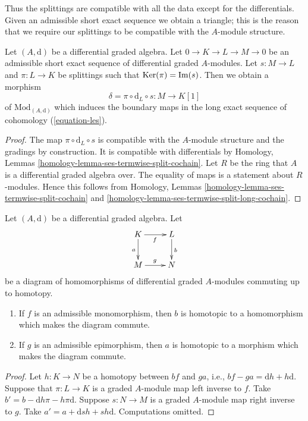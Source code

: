 \noindent
Thus the splittings are compatible with all the data except for
the differentials. Given an admissible short exact sequence we
obtain a triangle; this is the reason that we require our splittings
to be compatible with the $A$-module structure.

\begin{lemma}
\label{lemma-admissible-ses}
Let $(A, \text{d})$ be a differential graded algebra.
Let $0 \to K \to L \to M \to 0$ be an admissible short exact sequence
of differential graded $A$-modules. Let $s : M \to L$ and $\pi : L \to K$
be splittings such that $\mathop{\mathrm{Ker}}(\pi) = \mathop{\mathrm{Im}}(s)$.
Then we obtain a morphism
$$
\delta = \pi \circ \text{d}_L \circ s : M \to K[1]
$$
of $\text{Mod}_{(A, \text{d})}$ which induces the boundary maps
in the long exact sequence of cohomology (\ref{equation-les}).
\end{lemma}

\begin{proof}
The map $\pi \circ \text{d}_L \circ s$ is compatible with the $A$-module
structure and the gradings by construction. It is compatible with
differentials by Homology, Lemmas
\ref{homology-lemma-ses-termwise-split-cochain}.
Let $R$ be the ring that $A$ is a differential graded algebra over.
The equality of maps is a statement about $R$-modules. Hence this
follows from Homology, Lemmas
\ref{homology-lemma-ses-termwise-split-cochain} and
\ref{homology-lemma-ses-termwise-split-long-cochain}.
\end{proof}

\begin{lemma}
\label{lemma-make-commute-map}
Let $(A, \text{d})$ be a differential graded algebra. Let
$$
\xymatrix{
K \ar[r]_f \ar[d]_a & L \ar[d]^b \\
M \ar[r]^g & N
}
$$
be a diagram of homomorphisms of differential graded $A$-modules
commuting up to homotopy.
\begin{enumerate}
\item If $f$ is an admissible monomorphism, then $b$ is homotopic to a
homomorphism which makes the diagram commute.
\item If $g$ is an admissible epimorphism, then $a$ is homotopic to a
morphism which makes the diagram commute.
\end{enumerate}
\end{lemma}

\begin{proof}
Let $h : K \to N$ be a homotopy between $bf$ and $ga$, i.e.,
$bf - ga = \text{d}h + h\text{d}$. Suppose that $\pi : L \to K$
is a graded $A$-module map left inverse to $f$. Take
$b' = b - \text{d}h\pi - h\pi \text{d}$.
Suppose $s : N \to M$ is a graded $A$-module map right inverse to $g$.
Take $a' = a + \text{d}sh + sh\text{d}$.
Computations omitted.
\end{proof}

